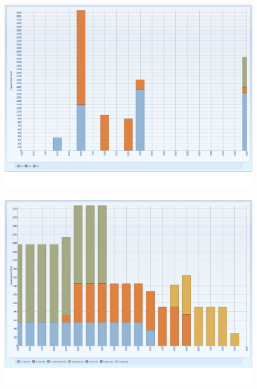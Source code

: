 \documentclass{article}
\begin{document}
\begin{figure}[htbp]
\begin{center}
\includegraphics[width=13cm,keepaspectratio=true]{figures/Expansion/GreenCertificate/CapacityBuiltInterfaceGC}
\caption{}
\label{fig:CapacityBuiltInterfaceGC}
\end{center}
\end{figure}
\begin{figure}[htbp]
\begin{center}
\includegraphics[width=13cm,keepaspectratio=true]{figures/Expansion/GreenCertificate/CapacityBuiltNewGenGC}
\caption{}
\label{fig:CapacityBuiltNewGenGC}
\end{center}
\end{figure}
\end{document}
